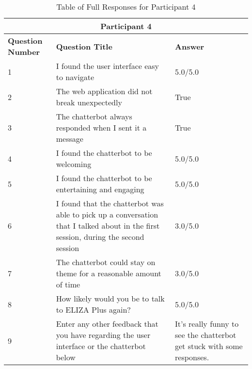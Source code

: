 \begin{table}[H]
	\centering
	\begin{tabular}{ |m{1.8cm}|m{6.5cm}| m{7cm}|} 
		\hline
		\multicolumn{3}{|c|}{Participant 4} \\
		\hline
		\textbf{Question Number} & \textbf{Question Title} & \textbf{Answer}\\ 
		\hline
		1 & I found the user interface easy to navigate & 5.0/5.0\\ 
		\hline
		2 & 
		The web application did not break unexpectedly & True \\ 
		\hline
		3 & The chatterbot always responded when I sent it a message & True\\
		\hline 
		4 & I found the chatterbot to be welcoming & 5.0/5.0\\
		\hline
		5 & I found the chatterbot to be entertaining and engaging & 5.0/5.0\\
		\hline
		6 & I found that the chatterbot was able to pick up a conversation that I talked about in the first session, during the second session  & 3.0/5.0\\
		\hline
		7 & The chatterbot could stay on theme for a reasonable amount of time & 3.0/5.0 \\
		\hline
		8 & 
		How likely would you be to talk to ELIZA Plus again? & 5.0/5.0\\
		\hline
		9 & 
		Enter any other feedback that you have regarding the user interface or the chatterbot below & It's really funny to see the chatterbot get stuck with some responses.\\
		\hline
	\end{tabular}
	\caption{Table of Full Responses for Participant 4}
\end{table}

